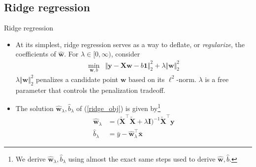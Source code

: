 \documentclass{beamer}
\numberwithin{equation}{section}
\newcommand{\aref}[1]{\alert{\ref{#1}}}
\begin{document}
\subsection{Ridge regression}

\begin{frame}{Ridge regression}
    \begin{itemize}
        \item
        At its simplest, ridge regression serves as a way to deflate, or
        \textit{regularize}, the coefficients of $ \hat{\mathbf{w}} $. For
        $ \lambda \in [0, \infty) $, consider
        \begin{equation} \label{ridge_obj}
            \begin{array}{ll}
                \displaystyle\min_{\mathbf{w}, b} &
                \Vert\mathbf{y} - \mathbf{Xw} - b\mathbf{1}\Vert_2^2 +
                \lambda\Vert\mathbf{w}\Vert_2^2
            \end{array}
        \end{equation}
        $ \lambda\Vert\mathbf{w}\Vert_2^2 $ penalizes a candidate point
        $ \mathbf{w} $ based on its $ \ell^2 $-norm. $ \lambda $ is a free
        parameter that controls the penalization tradeoff.

        \item
        The solution $ \hat{\mathbf{w}}_\lambda, \hat{b}_\lambda $ of
        (\aref{ridge_obj}) is given by\footnote{
            We derive $ \hat{\mathbf{w}}_\lambda, \hat{b}_\lambda $ using
            almost the exact same steps used to derive $ \hat{\mathbf{w}},
            \hat{b} $.
        }
        \begin{equation} \label{ridge_sol}
            \begin{split}
                \hat{\mathbf{w}}_\lambda & = \big(
	                \tilde{\mathbf{X}}^\top\tilde{\mathbf{X}} +
	                \lambda\mathbf{I}
	            \big)^{-1}\tilde{\mathbf{X}}^\top\mathbf{y} \\
	            \hat{b}_\lambda & = \bar{y} - \hat{\mathbf{w}}_\lambda^\top
	            \bar{\mathbf{x}}
            \end{split}
        \end{equation}
    \end{itemize}
\end{frame}
\end{document}
